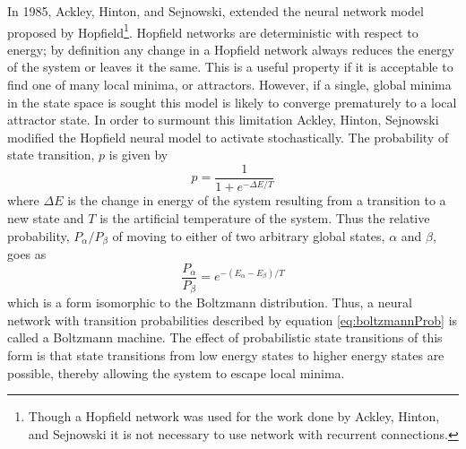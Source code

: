 \documentclass[11pt]{afthesis}
\begin{document}
	In 1985, Ackley, Hinton, and Sejnowski, extended the neural network model proposed by Hopfield\footnote{Though a Hopfield network was used for the work done by Ackley, Hinton, and Sejnowski it is not necessary to use network with recurrent connections.}. Hopfield networks are deterministic with respect to energy; by definition any change in a Hopfield network always reduces the energy of the system or leaves it the same. This is a useful property if it is acceptable to find one of many local minima, or attractors. However, if a single, global minima in the state space is sought this model is likely to converge prematurely to a local attractor state. In order to surmount this limitation Ackley, Hinton, Sejnowski modified the Hopfield neural model to activate stochastically. The probability of state transition, \begin{math}p\end{math} is given by \begin{equation} \label{eq:boltzmannProb}
	p= \frac{1}{1 + e^{- \Delta E  / T} }
	\end{equation} where \begin{math} \Delta E \end{math} is the change in energy of the system resulting from a transition to a new state and \begin{math}T\end{math} is the artificial temperature of the system. Thus the relative probability, \begin{math}P_{\alpha}/P_{\beta}\end{math} of moving to either of two arbitrary global states, \begin{math}\alpha\end{math} and \begin{math}\beta\end{math}, goes as \begin{equation} \label{eq:boltzmannDist}
	\frac{P_{\alpha}}{P_{\beta}} =  e^{- (E_{\alpha} - E_{\beta} ) / T} 
	\end{equation} which is a form isomorphic to the Boltzmann distribution. Thus, a neural network with transition probabilities described by equation \ref{eq:boltzmannProb} is called a Boltzmann machine. The effect of probabilistic state transitions of this form is that state transitions from low energy states to higher energy states are possible, thereby allowing the system to escape local minima. 
	
\end{document}

